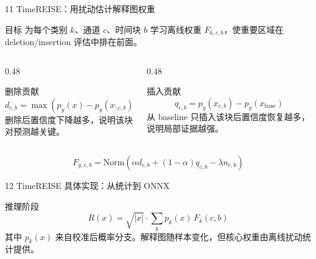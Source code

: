 \documentclass[aspectratio=169]{beamer}
\begin{document}
\begin{frame}{11 TimeREISE：用扰动估计解释图权重}
    \small
    \begin{block}{目标}
        为每个类别 $k$、通道 $c$、时间块 $b$ 学习离线权重 $F_{k,c,b}$，使重要区域在 deletion/insertion 评估中排在前面。
    \end{block}
    \begin{columns}[T,onlytextwidth]
        \begin{column}{0.48\textwidth}
            \begin{exampleblock}{删除贡献}
                \[
                    d_{c,b}=\max(p_y(x)-p_y(x_{\setminus c,b}),0)
                \]
                删除后置信度下降越多，说明该块对预测越关键。
            \end{exampleblock}
        \end{column}
        \begin{column}{0.48\textwidth}
            \begin{exampleblock}{插入贡献}
                \[
                    q_{c,b}=p_y(x_{c,b})-p_y(x_{\mathrm{base}})
                \]
                从 baseline 只插入该块后置信度恢复越多，说明局部证据越强。
            \end{exampleblock}
        \end{column}
    \end{columns}
    \[
        F_{y,c,b}=\mathrm{Norm}\left(\alpha d_{c,b}+(1-\alpha)q_{c,b}-\lambda n_{c,b}\right)
    \]
\end{frame}

\begin{frame}{12 TimeREISE 具体实现：从统计到 ONNX}
    \small
    \begin{center}
    \end{center}
    \begin{block}{推理阶段}
        \[
            R(x)=\sqrt{|x|}\cdot \sum_k p_k(x)\,F_k(c,b)
        \]
        其中 $p_k(x)$ 来自校准后概率分支。解释图随样本变化，但核心权重由离线扰动统计提供。
    \end{block}
\end{frame}
\end{document}
